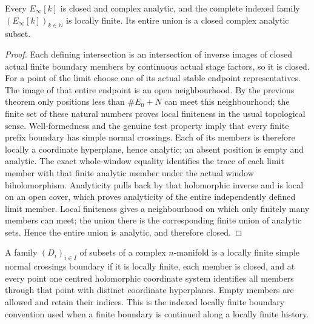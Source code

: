 \begin{theorem}
\label{hir:actual-lf-boundary-analytic-locally-finite}
\leanok
Every $E_\infty[k]$ is closed and complex analytic, and the complete indexed family
$(E_\infty[k])_{k\in\mathbb N}$ is locally finite.  Its entire union is a closed complex analytic subset.
\end{theorem}
\begin{proof}
Each defining intersection is an intersection of inverse images of closed actual
finite boundary members by continuous actual stage factors, so it is closed.
For a point of the limit choose one of its actual stable endpoint representatives.
The image of that entire endpoint is an open neighbourhood.  By the previous
theorem only positions less than $\#E_0+N$ can meet this neighbourhood; the finite
set of these natural numbers proves local finiteness in the usual topological
sense.  Well-formedness and the genuine test property imply that every finite
prefix boundary has simple normal crossings.  Each of its members is therefore
locally a coordinate hyperplane, hence analytic; an absent position is empty and
analytic.  The exact whole-window equality identifies the trace of each limit
member with that finite analytic member under the actual window biholomorphism.
Analyticity pulls back by that holomorphic inverse and is local on an open cover,
which proves analyticity of the entire independently defined limit member.
Local finiteness gives a neighbourhood on which only finitely many members can
meet; the union there is the corresponding finite union of analytic sets.
Hence the entire union is analytic, and therefore closed.
\end{proof}

\begin{definition}
\label{hir:actual-lf-boundary-indexed-snc}
\leanok
A family $(D_i)_{i\in I}$ of subsets of a complex $n$-manifold is a locally finite
simple normal crossings boundary if it is locally finite, each member is closed,
and at every point one centred holomorphic coordinate system identifies all
members through that point with distinct coordinate hyperplanes.  Empty members
are allowed and retain their indices.  This is the indexed locally finite
boundary convention used when a finite boundary is continued along a locally
finite history.
\end{definition}

